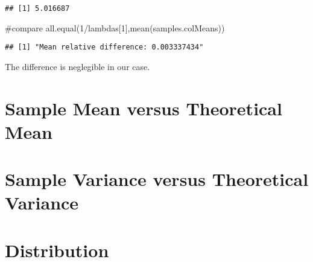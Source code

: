 \documentclass[9pt,]{article}
\newenvironment{Shaded}{}{}
\newcommand{\KeywordTok}[1]{\textcolor[rgb]{0.00,0.00,1.00}{{#1}}}
\newcommand{\DecValTok}[1]{{#1}}
\newcommand{\CommentTok}[1]{\textcolor[rgb]{0.00,0.50,0.00}{{#1}}}
\newcommand{\NormalTok}[1]{{#1}}
\begin{document}
\begin{verbatim}
## [1] 5.016687
\end{verbatim}

\begin{Shaded}
\begin{Highlighting}[]
\CommentTok{#compare}
\KeywordTok{all.equal}\NormalTok{(}\DecValTok{1}\NormalTok{/lambdas[}\DecValTok{1}\NormalTok{],}\KeywordTok{mean}\NormalTok{(samples.colMeans))}
\end{Highlighting}
\end{Shaded}

\begin{verbatim}
## [1] "Mean relative difference: 0.003337434"
\end{verbatim}

The difference is neglegible in our case.

\section{Sample Mean versus Theoretical
Mean}\label{sample-mean-versus-theoretical-mean}

\section{Sample Variance versus Theoretical
Variance}\label{sample-variance-versus-theoretical-variance}

\section{Distribution}\label{distribution}
\end{document}
